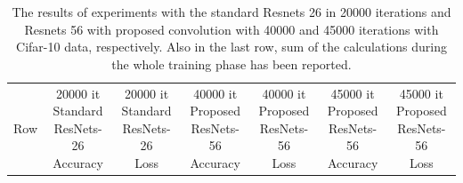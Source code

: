 \documentclass{report}
\begin{document}
\begin{table}
	\begin{center}
		\caption{
			The results of experiments with the standard Resnets
			26 in 20000 iterations and 
			Resnets
			56
			with proposed convolution with 40000 and 45000 iterations with Cifar-10 data, respectively. Also in the last row, sum of the calculations during the whole training phase has been reported.
		}
		\label{t1}
		\begin{tabular}{c|c|c|c|c|c|c}
			Row &  
			\thead {
				20000 it\\
				Standard
				\\
				ResNets-26 \\Accuracy}
			&
			\thead {
				20000 it\\
				Standard
				\\
				ResNets-26 \\Loss}
			&
			\thead {
				40000 it\\
				Proposed
				\\
				ResNets-56 \\Accuracy}
			&
			\thead {
				40000 it\\
				Proposed
				\\
				ResNets-56 \\Loss}
			&
			\thead {
				45000 it\\
				Proposed
				\\
				ResNets-56 \\
				Accuracy 	}
			&
			\thead {
				45000 it\\Proposed
				\\
				ResNets-56  \\Loss}
			

\end{tabular}
\end{center}
\end{table}
\end{document}
